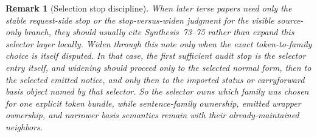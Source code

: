 \documentclass[11pt]{article}
\newtheorem{remark}{Remark}
\begin{document}
\begin{remark}[Selection stop discipline]
When later terse papers need only the stable request-side stop or the stop-versus-widen judgment for the visible source-only branch, they should usually cite Synthesis~73--75 rather than expand this selector layer locally.
Widen through this note only when the exact token-to-family choice is itself disputed. In that case, the first sufficient audit stop is the selector entry itself, and widening should proceed only to the selected normal form, then to the selected emitted notice, and only then to the imported status or carryforward basis object named by that selector.
So the selector owns which family was chosen for one explicit token bundle, while sentence-family ownership, emitted wrapper ownership, and narrower basis semantics remain with their already-maintained neighbors.
\end{remark}
\end{document}
